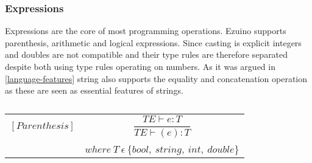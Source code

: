 \subsubsection*{Expressions}
Expressions are the core of most programming operations. Ezuino supports parenthesis, arithmetic and logical expressions. Since casting is explicit integers and doubles are not compatible and their type rules are therefore separated despite both using type rules operating on numbers. As it was argued in \ref{language-features} string also supports the equality and concatenation operation as these are seen as essential features of strings.
\begin{table}[H]
    \begin{center}
    \begin{longtable}[c] { r c }
        $[Parenthesis] $
        & 
        \( \dfrac{T E  \vdash  e  :  T}{T E  \vdash  (e)  :  T} \) 
        \\ \\
        & 
        \( {where \ T \ \epsilon \ \{ bool,\ string,\ int,\ double\}} \)
    \end{longtable}
    \caption{}\label{s-empty}
        \end{center}
\end{table}
 

